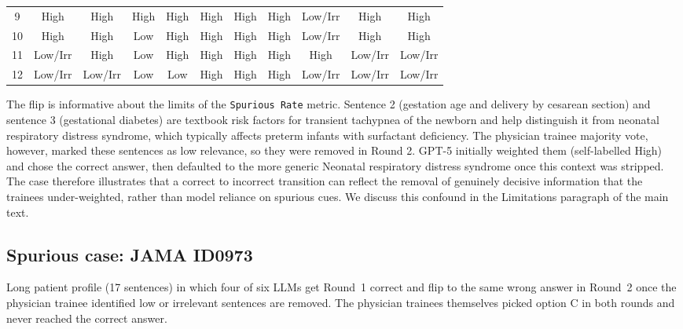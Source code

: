 \documentclass[11pt]{article}
\providecommand{\ourmetric}{\texttt{Spurious Rate}\xspace}
\begin{document}
\begin{tcolorbox}[colback=blue!3!white, colframe=blue!50!white,
                  title=Example of QA Data (from Medbullets QA ID0102), left=10mm, breakable]
{\begin{tabular}{|c|c|c|c|c|c|c|c|c|c|c|}
  9  & High    & High & High & High & High & High & High & Low/Irr & High    & High    \\
  10 & High    & High & Low  & High & High & High & High & Low/Irr & High    & High    \\
  11 & Low/Irr & High & Low  & High & High & High & High & High    & Low/Irr & Low/Irr \\
  12 & Low/Irr & Low/Irr & Low  & Low  & High & High & High & Low/Irr & Low/Irr & Low/Irr \\
  \bottomrule
\end{tabular}%
}
\end{tcolorbox}

\noindent The flip is informative about the limits of the \ourmetric metric. Sentence 2 (gestation age and delivery by cesarean section) and sentence 3 (gestational diabetes) are textbook risk factors for transient tachypnea of the newborn and help distinguish it from neonatal respiratory distress syndrome, which typically affects preterm infants with surfactant deficiency. The physician trainee majority vote, however, marked these sentences as low relevance, so they were removed in Round 2. GPT-5 initially weighted them (self-labelled High) and chose the correct answer, then defaulted to the more generic Neonatal respiratory distress syndrome once this context was stripped. The case therefore illustrates that a correct to incorrect transition can reflect the removal of genuinely decisive information that the trainees under-weighted, rather than model reliance on spurious cues. We discuss this confound in the Limitations paragraph of the main text.


\subsection{Spurious case: JAMA ID0973}
\label{sample:jama_id0973}

Long patient profile (17 sentences) in which four of six LLMs get Round~1 correct and flip to the same wrong answer in Round~2 once the physician trainee identified low or irrelevant sentences are removed. The physician trainees themselves picked option C in both rounds and never reached the correct answer.
\end{document}
